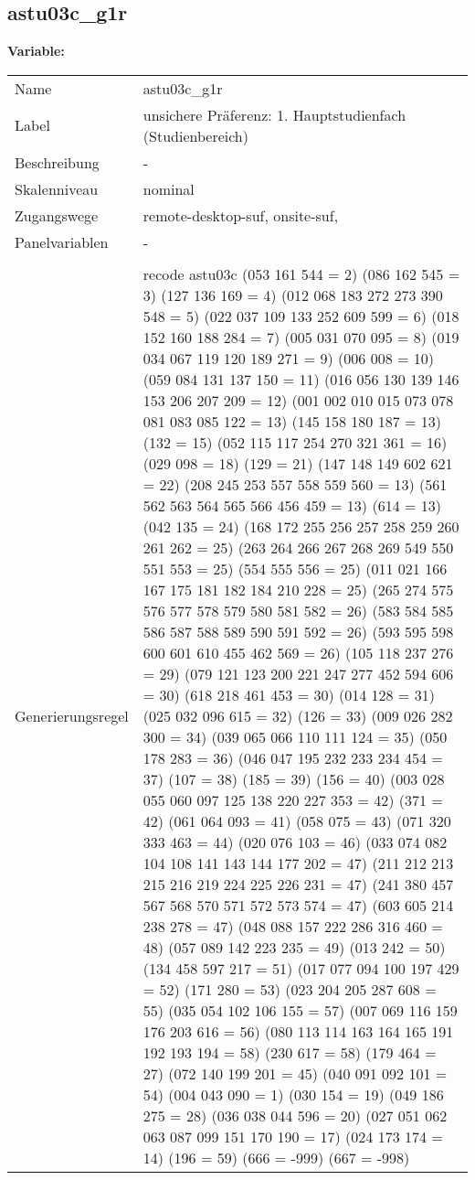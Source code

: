 	
	
	\subsection{astu03c\_g1r}
	\label{subSection:astu03c_g1r}

	\noindent\textbf{Variable:}\\
		\begin{tabular}{lL{11.3cm}}
			\label{tableVariable:astu03c_g1r}
			Name & astu03c\_g1r \\
			Label & unsichere Präferenz: 1. Hauptstudienfach  (Studienbereich) \\
			Beschreibung & - \\
			Skalenniveau & nominal \\
			Zugangswege &
				remote-desktop-suf,
				onsite-suf,
 \\
			Panelvariablen & -
			 \\
			 \\
					Generierungsregel & recode astu03c (053 161 544 = 2)  (086 162 545 = 3) (127 136 169 = 4) (012 068 183 272 273 390 548 = 5) (022 037 109 133 252 609 599 = 6) (018 152 160 188 284 = 7) (005 031 070 095 = 8) (019 034 067 119 120 189 271 = 9) (006 008 = 10) (059 084 131 137 150 = 11) (016 056 130 139 146 153 206 207 209   = 12) (001 002 010 015 073 078 081 083 085 122  = 13) (145 158 180 187 = 13) (132 = 15) (052 115 117 254 270 321 361 = 16) (029 098 = 18) (129 = 21) (147 148 149 602 621 = 22) (208 245 253 557 558 559 560 = 13) (561 562 563 564 565 566 456 459 = 13) (614 = 13) (042 135 = 24) (168 172 255 256 257 258 259 260 261 262  = 25) (263 264 266 267 268 269 549 550 551 553  = 25) (554 555 556 = 25) (011 021 166 167 175 181 182 184 210 228 = 25) (265 274 575 576 577 578 579 580 581 582 = 26) (583 584 585 586 587 588 589 590 591 592  = 26) (593 595 598 600 601 610 455 462 569 = 26) (105 118 237 276 = 29) (079 121 123 200 221 247 277 452 594 606 = 30) (618 218 461 453 = 30)  (014 128 = 31) (025 032 096 615 = 32) (126 = 33) (009 026 282 300 = 34) (039 065 066 110 111 124 = 35) (050 178 283 = 36) (046 047 195 232 233 234 454 = 37) (107 = 38)    (185 = 39) (156 = 40) (003 028 055 060 097 125 138 220 227 353 = 42)  (371 = 42)  (061 064 093 = 41) (058 075 = 43) (071 320 333 463 = 44)  (020 076 103 = 46) (033 074 082 104 108 141 143 144 177 202  = 47) (211 212 213 215 216 219 224 225 226 231  = 47) (241 380 457 567 568 570 571 572 573 574 = 47) (603 605 214 238 278 = 47) (048 088 157 222 286 316 460 = 48) (057 089 142 223 235 = 49) (013 242 = 50) (134 458 597 217 = 51) (017 077 094 100 197 429 = 52) (171 280 = 53) (023 204 205 287 608 = 55) (035 054 102 106 155 = 57) (007 069 116 159 176 203 616 = 56) (080 113 114 163 164 165 191 192 193 194  = 58) (230 617 = 58) (179 464 = 27) (072 140 199 201 = 45) (040 091 092 101 = 54) (004 043 090 = 1) (030 154 = 19) (049 186 275 = 28) (036 038 044 596 = 20) (027 051 062 063 087 099 151 170 190 = 17) (024 173 174 = 14) (196 = 59) (666 = -999) (667 = -998) 

\end{tabular}
